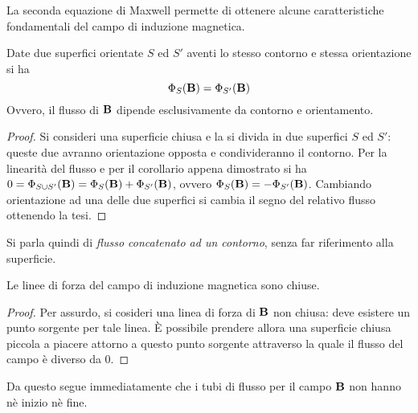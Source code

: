 La seconda equazione di Maxwell permette di ottenere alcune caratteristiche fondamentali del campo di induzione magnetica.
\begin{cor}
    Date due superfici orientate $S$ ed $S'$ aventi lo stesso contorno e stessa orientazione si ha
    \[
        \Phi_S(\vb{B})=\Phi_{S'}(\vb{B})
    \]
    Ovvero, il flusso di $\vb{B}$ dipende esclusivamente da contorno e orientamento.
\end{cor}
\begin{proof}
    Si consideri una superficie chiusa e la si divida in due superfici $S$ ed $S'$:
    queste due avranno orientazione opposta e condivideranno il contorno.
    Per la linearità del flusso e per il corollario appena dimostrato
    si ha $0=\Phi_{S\cup S'}(\vb{B})=\Phi_{S}(\vb{B})+\Phi_{S'}(\vb{B})$,
    ovvero $\Phi_{S}(\vb{B})=-\Phi_{S'}(\vb{B})$.
    Cambiando orientazione ad una delle due superfici si cambia il segno del relativo flusso ottenendo la tesi.
\end{proof}
Si parla quindi di \textit{flusso concatenato ad un contorno}, senza far riferimento alla superficie.
\begin{cor}
    Le linee di forza del campo di induzione magnetica sono chiuse.
\end{cor}
\begin{proof}
    Per assurdo, si cosideri una linea di forza di $\vb{B}$ non chiusa:
    deve esistere un punto sorgente per tale linea. È possibile prendere allora una superficie chiusa piccola a piacere
    attorno a questo punto sorgente attraverso la quale il flusso del campo è diverso da 0.
\end{proof}
Da questo segue immediatamente che i tubi di flusso per il campo $\vb{B}$ non hanno nè inizio nè fine.
